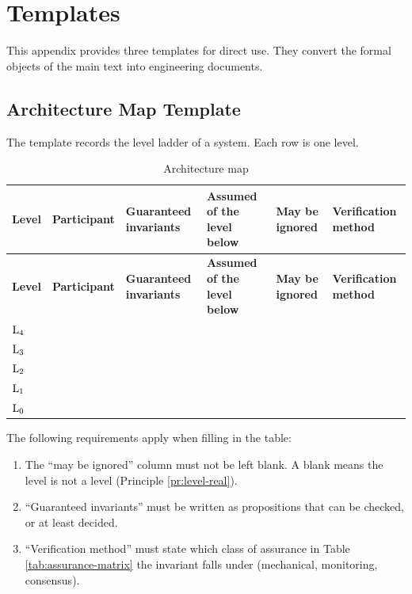 \chapter{Templates}\label{app:templates}

This appendix provides three templates for direct use. They convert the formal objects of the
main text into engineering documents.

\section{Architecture Map Template}

The template records the level ladder of a system. Each row is one level.

{\small\begin{longtable}{L{1.1cm}L{2.2cm}L{2.9cm}L{2.5cm}L{2.6cm}L{2.3cm}}
\caption{Architecture map}\label{tab:tpl-architecture}\\
\toprule
\textbf{Level} & \textbf{Participant} & \textbf{Guaranteed invariants} &
\textbf{Assumed of the level below} & \textbf{May be ignored} &
\textbf{Verification method} \\
\midrule
\endfirsthead
\toprule
\textbf{Level} & \textbf{Participant} & \textbf{Guaranteed invariants} &
\textbf{Assumed of the level below} & \textbf{May be ignored} &
\textbf{Verification method} \\
\midrule
\endhead
\bottomrule
\endlastfoot
$\mathrm{L}_{4}$ & & & & & \\
$\mathrm{L}_{3}$ & & & & & \\
$\mathrm{L}_{2}$ & & & & & \\
$\mathrm{L}_{1}$ & & & & & \\
$\mathrm{L}_{0}$ & & & & & \\
\end{longtable}}

The following requirements apply when filling in the table:

\begin{enumerate}[label=(\arabic*)]
\item The ``may be ignored'' column must not be left blank. A blank means the level is not a
      level (Principle \ref{pr:level-real}).
\item ``Guaranteed invariants'' must be written as propositions that can be checked, or at
      least decided.
\item ``Verification method'' must state which class of assurance in
      Table \ref{tab:assurance-matrix} the invariant falls under (mechanical, monitoring,
      consensus).
\end{enumerate}

